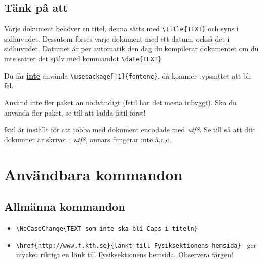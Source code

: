 \documentclass[a4paper]{article}
\newcommand{\bs}{\textbackslash}
\begin{document}
\subsection{Tänk på att}
Varje dokument behöver en titel, denna sätts med \texttt{\bs title\{TEXT\}} och syns i sidhuvudet. Dessutom förses varje dokument med ett datum, också det i sidhuvudet. Datumet är per automatik den dag du kompilerar dokumentet om du inte sätter det själv med kommandot \texttt{\bs date\{TEXT\}}

Du får \textbf{\underline{inte}} använda \texttt{\bs usepackage[T1]\{fontenc\}}, då kommer typsnittet att bli fel.

Använd inte fler paket än nödvändigt (fstil har det mesta inbyggt). Ska du använda fler paket, se till att ladda fstil först!

fstil är inställt för att jobba med dokument encodade med \textit{utf8}. Se till så att ditt dokumnet är skrivet i \textit{utf8}, annars fungerar inte å,ä,ö.

\section{Användbara kommandon}

\subsection{Allmänna kommandon}
\begin{itemize}
\item \texttt{\bs NoCaseChange\{TEXT som inte ska bli Caps i titeln\} }
\item \texttt{\bs href\{http://www.f.kth.se\}\{länkt till Fysiksektionens hemsida\} } ger mycket riktigt en  \href{http://www.f.kth.se}{länk till Fysiksektionens hemsida}. Observera färgen!
\end{itemize}
\end{document}

